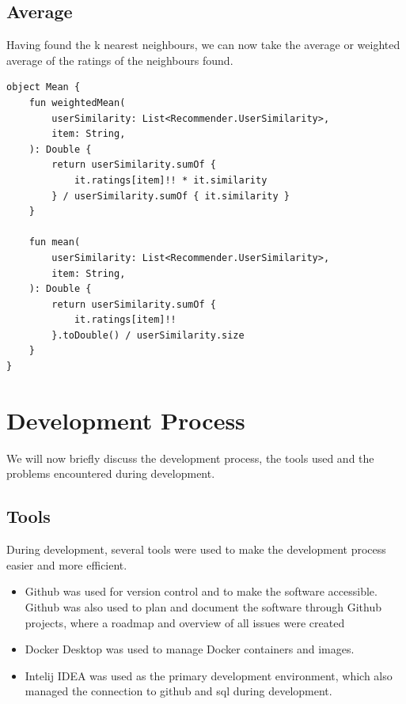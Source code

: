 \subsection{Average}

Having found the k nearest neighbours, we can now take the average or weighted average of the ratings of the neighbours found.

\newpage

\begin{verbatim}
object Mean {
    fun weightedMean(
        userSimilarity: List<Recommender.UserSimilarity>,
        item: String,
    ): Double {
        return userSimilarity.sumOf {
            it.ratings[item]!! * it.similarity
        } / userSimilarity.sumOf { it.similarity }
    }

    fun mean(
        userSimilarity: List<Recommender.UserSimilarity>,
        item: String,
    ): Double {
        return userSimilarity.sumOf {
            it.ratings[item]!!
        }.toDouble() / userSimilarity.size
    }
}
\end{verbatim}

\section{Development Process}

\label{sec:dev_process}

We will now briefly discuss the development process, the tools used and the problems encountered during development.

\subsection{Tools}

During development, several tools were used to make the development process easier and more efficient.

\begin{itemize}
    \item Github was used for version control and to make the software accessible. Github was also used to plan and document the software through Github projects, where a roadmap and overview of all issues were created
    \item Docker Desktop was used to manage Docker containers and images.
    \item Intelij IDEA was used as the primary development environment, which also managed the connection to github and sql during development.
\end{itemize}

